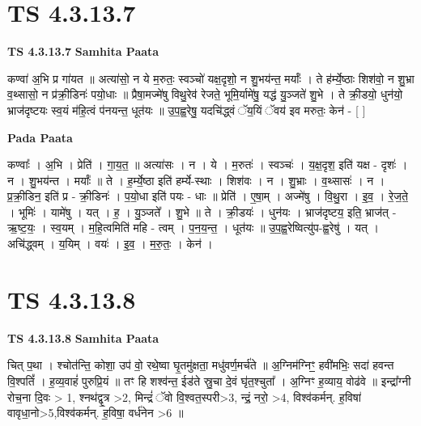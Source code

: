 \documentclass[17pt]{extarticle}
\begin{document}
\section*{ TS 4.3.13.7 }

\textbf{TS 4.3.13.7 } \newline
\textbf{Samhita Paata} \newline

कण्वा॑ अ॒भि प्र गा॑यत ॥ अत्या॑सो॒ न ये म॒रुतः॒ स्वञ्चो॑ यक्ष॒दृशो॒ न शु॒भय॑न्त॒ मर्याः᳚ । ते ह॑र्म्ये॒ष्ठाः शिश॑वो॒ न शु॒भ्रा व॒थ्सासो॒ न प्र॑क्री॒डिनः॑ पयो॒धाः ॥ प्रैषा॒मज्मे॑षु विथु॒रेव॑ रेजते॒ भूमि॒र्यामे॑षु॒ यद्ध॑ यु॒ञ्जते॑ शु॒भे । ते क्री॒डयो॒ धुन॑यो॒ भ्राज॑दृष्टयः स्व॒यं म॑हि॒त्वं प॑नयन्त॒ धूत॑यः ॥ उ॒प॒ह्व॒रेषु॒ यदचि॑द्ध्वं ॅय॒यिं ॅवय॑ इव मरुतः॒ केन॑ - [  ] \newline

\textbf{Pada Paata} \newline

कण्वाः᳚ । अ॒भि । प्रेति॑ । गा॒य॒त॒ ॥ अत्या॑सः । न । ये । म॒रुतः॑ । स्वञ्चः॑ । य॒क्ष॒दृश॒ इति॑ यक्ष - दृशः॑ । न । शु॒भय॑न्त । मर्याः᳚ ॥ ते । ह॒र्म्ये॒ष्ठा इति॑ हर्म्ये-स्थाः । शिश॑वः । न । शु॒भ्राः । व॒थ्सासः॑ । न । प्र॒क्री॒डिन॒ इति॑ प्र - क्री॒डिनः॑ । प॒यो॒धा इति॑ पयः - धाः ॥ प्रेति॑ । ए॒षा॒म् । अज्मे॑षु । वि॒थु॒रा । इ॒व॒ । रे॒ज॒ते॒ । भूमिः॑ । यामे॑षु । यत् । ह॒ । यु॒ञ्जते᳚ । शु॒भे ॥ ते । क्री॒डयः॑ । धुन॑यः । भ्राज॑दृष्टय॒ इति॒ भ्राज॑त् - ऋ॒ष्ट॒यः॒ । स्व॒यम् । म॒हि॒त्वमिति॑ महि - त्वम् । प॒न॒य॒न्त॒ । धूत॑यः ॥ उ॒प॒ह्व॒रेष्वित्यु॑प-ह्व॒रेषु॑ । यत् । अचि॑द्ध्वम् । य॒यिम् । वयः॑ । इ॒व॒ । म॒रु॒तः॒ । केन॑ ।  \newline




\section*{ TS 4.3.13.8 }

\textbf{TS 4.3.13.8 } \newline
\textbf{Samhita Paata} \newline

चित् प॒था । श्चोत॑न्ति॒ कोशा॒ उप॑ वो॒ रथे॒ष्वा घृ॒तमु॑क्षता॒ मधु॑वर्ण॒मर्च॑ते ॥ अ॒ग्निम॑ग्निꣳ॒॒ हवी॑मभिः॒ सदा॑ हवन्त वि॒श्पतिं᳚ । ह॒व्य॒वाहं॑ पुरुप्रि॒यं ॥ तꣳ हि शश्व॑न्त॒ ईड॑ते स्रु॒चा दे॒वं घृ॑त॒श्चुता᳚ । अ॒ग्निꣳ ह॒व्याय॒ वोढ॑वे ॥ इन्द्रा᳚ग्नी रोच॒ना दि॒वः > 1, श्नथ॑द्वृ॒त्र >2, मिन्द्रं॑ ॅवो वि॒श्वत॒स्परी>3, न्द्रं॒ नरो॒ >4, विश्व॑कर्मन्. ह॒विषा॑ वावृधा॒नो>5,विश्व॑कर्मन्. ह॒विषा॒ वर्ध॑नेन >6 ॥ \newline
\end{document}
